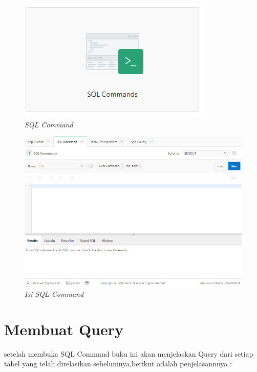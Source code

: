 \begin{figure}
        \begin{center}
        \includegraphics[scale=0.5]{figures/sql_command.png}
        \caption{\textit{SQL Command}}
        \end{center}
        \end{figure}
\begin{figure}
       
        \begin{center}
        \includegraphics[scale=0.5]{figures/sql_command2.png}
        \caption{\textit{Isi SQL Command}}
        \end{center}
        \end{figure}

\section{Membuat Query}
setelah membuka SQL Command buku ini akan menjelaskan Query dari setiap tabel yang telah direlasikan sebelumnya,berikut adalah penjelasannnya :

